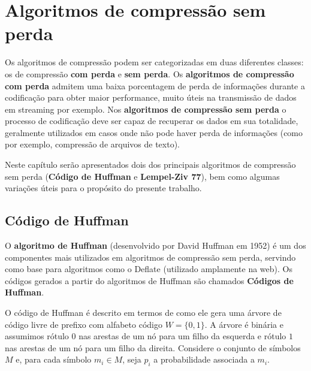 \chapter{Algoritmos de compressão sem perda}

Os algoritmos de compressão podem ser categorizadas em duas diferentes classes: os de compressão \textbf{com perda} e \textbf{sem perda}. 
Os \textbf{algoritmos de compressão com perda} admitem uma baixa porcentagem de perda de informações durante a codificação para obter maior performance, muito úteis na transmissão de dados em streaming por exemplo. 
Nos \textbf{algoritmos de compressão sem perda} o processo de codificação deve ser capaz de recuperar os dados em sua totalidade, geralmente utilizados em casos onde não pode haver perda de informações (como por exemplo, compressão de arquivos de texto).

Neste capítulo serão apresentados dois dos principais algoritmos de compressão sem perda (\textbf{Código de Huffman} e \textbf{Lempel-Ziv 77}), bem como algumas variações úteis para o propósito do presente trabalho.

\pagebreak

\section{Código de Huffman} \label{sec:huff}
O \textbf{algoritmo de Huffman} (desenvolvido por David Huffman em 1952) é um dos componentes mais utilizados em algoritmos de compressão sem perda, servindo como base para algoritmos como o Deflate (utilizado amplamente na web).
Os códigos gerados a partir do algoritmos de Huffman são chamados \textbf{Códigos de Huffman}.

O código de Huffman é descrito em termos de como ele gera uma árvore
de código livre de prefixo com alfabeto código $W = \{0,1\}$. A árvore
é binária e assumimos rótulo $0$ nas arestas de um nó para um filho da
esquerda e rótulo $1$ nas arestas de um nó para um filho da direita.
Considere o conjunto de símbolos $M$ e, para cada símbolo $m_i\in M$,
seja $p_i$ a probabilidade associada a $m_i$.

